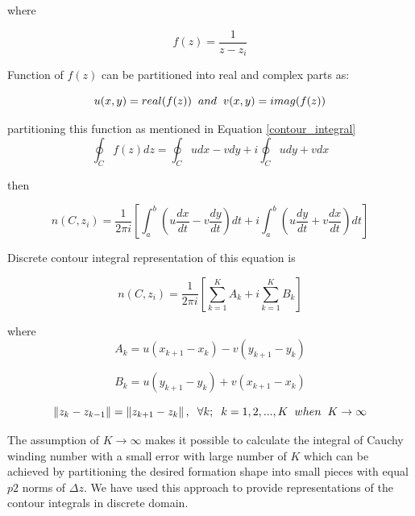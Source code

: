 where 

\begin{equation}
f(z) = \frac{1}{z-z_i}
\end{equation}
		
Function of $f(z)$ can be partitioned into real and complex parts as:

\begin{equation}
u(x,y) = real(f(z))  \hspace{0.2cm} and \hspace{0.2cm} v(x,y) = imag(f(z))
\end{equation}
		
partitioning this function as mentioned in Equation \ref{contour_integral}
\begin{equation}
\oint_C f(z)dz  = \oint_C u dx - v dy + i \oint_C u dy + v dx 
\end{equation}

then

\begin{equation}
n(C,z_i)  = \frac{1}{2\pi i} \left[\int_{a}^{b} \left(u\frac{dx}{dt} - v\frac{dy}{dt}\right)dt + i\int_{a}^{b}\left(u\frac{dy}{dt} + v\frac{dx}{dt}\right)dt\right]
\end{equation}
		
Discrete contour integral representation of this equation is
		
\begin{equation}
n(C,z_i)  = \frac{1}{2\pi i} {\left[\sum_{k=1}^{K} {A_k} + i\sum_{k=1}^{K} {B_k}\right]}
\end{equation}

where
\begin{equation}
A_k = u(x_{k+1} - x_k ) - v(y_{k+1} -y_k )
\end{equation}

\begin{equation}
B_k = u(y_{k+1} - y_k ) + v(x_{k+1} - x_k)
\end{equation}


\begin{equation}
\left\lVert z_k - z_{k-1}\right\rVert = \left\lVert z_{k+1} - z_k\right\rVert, \hspace{0.2cm}  \forall k ;  \hspace{0.2cm} k=1,2,...,K \hspace{0.2cm} when  \hspace{0.2cm} K \to\infty
\end{equation}

The assumption of $K \to\infty$ makes it possible to calculate the integral of Cauchy winding number with a small error with large number of $K$ which can be achieved by partitioning the desired formation shape  into small pieces with equal $p2$ norms of $\Delta z$. We have used this approach to provide representations of the contour integrals in discrete domain. 

